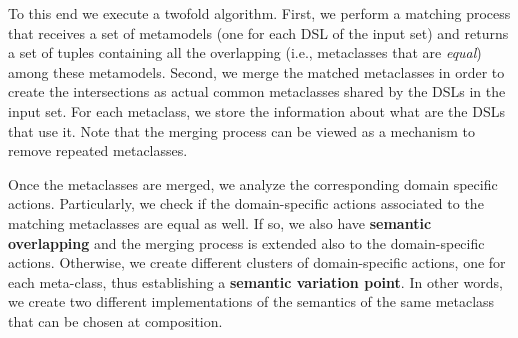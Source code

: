 To this end we execute a twofold algorithm. First, we perform a matching process that receives a set of metamodels (one for each DSL of the input set) and returns a set of tuples containing all the overlapping (i.e., metaclasses that are \textit{equal}) among these metamodels. Second, we merge the matched metaclasses in order to create the intersections as actual common metaclasses shared by the DSLs in the input set. For each metaclass, we store the information about what are the DSLs that use it. Note that the merging process can be viewed as a mechanism to remove repeated metaclasses.

Once the metaclasses are merged, we analyze the corresponding domain specific actions. Particularly, we check if the domain-specific actions associated to the matching metaclasses are equal as well. If so, we also have \textbf{semantic overlapping} and the merging process is extended also to the domain-specific actions. Otherwise, we create different clusters of domain-specific actions, one for each meta-class, thus establishing a \textbf{semantic variation point}. In other words, we create two different implementations of the semantics of the same metaclass that can be chosen at composition.






